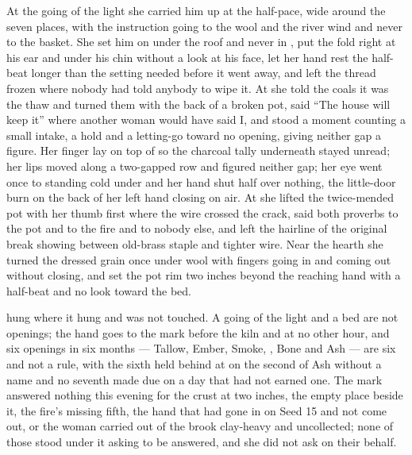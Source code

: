 \scenebreak

At the going of the light she carried him up at the half-pace, wide around the seven places, with the instruction going to the wool and the river wind and never to the basket. She set him on  under the roof and never in , put the fold right at his ear and under his chin without a look at his face, let her hand rest the half-beat longer than the setting needed before it went away, and left the thread frozen where nobody had told anybody to wipe it. At  she told the coals it was the thaw and turned them with the back of a broken pot, said “The house will keep it” where another woman would have said I, and stood a moment counting a small intake, a hold and a letting-go toward no opening, giving neither gap a figure. Her finger lay on top of  so the charcoal tally underneath stayed unread; her lips moved along a two-gapped row and figured neither gap; her eye went once to  standing cold under  and her hand shut half over nothing, the little-door burn on the back of her left hand closing on air. At  she lifted the twice-mended pot with her thumb first where the wire crossed the crack, said both proverbs to the pot and to the fire and to nobody else, and left the hairline of the original break showing between old-brass staple and tighter wire. Near the hearth she turned the dressed grain once under wool with fingers going in and coming out without closing, and set the pot rim two inches beyond the reaching hand with a half-beat and no look toward the bed.

 hung where it hung and was not touched. A going of the light and a bed are not openings; the hand goes to the mark before the kiln and at no other hour, and six openings in six months --- Tallow, Ember, Smoke, , Bone and Ash --- are six and not a rule, with the sixth held behind at  on the second of Ash without a name and no seventh made due on a day that had not earned one. The mark answered nothing this evening for the crust at two inches, the empty place beside it, the fire’s missing fifth, the hand that had gone in on Seed 15 and not come out, or the woman carried out of the brook clay-heavy and uncollected; none of those stood under it asking to be answered, and she did not ask on their behalf.

